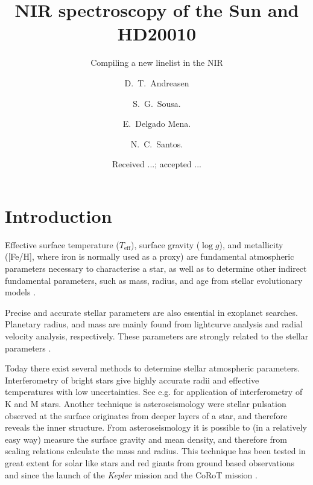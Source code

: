 \documentclass{aa}
\begin{document}
\title{NIR spectroscopy of the Sun and HD20010}
\subtitle{Compiling a new linelist in the NIR}


\author{D.~T.~Andreasen
    \and S.~G.~Sousa.
    \and E.~Delgado Mena.
    \and N.~C.~Santos.}









\date{Received ...; accepted ...}

\abstract{}{}{}{}



\maketitle



\section{Introduction}
\label{sec:introduction}

Effective surface temperature ($T_\mathrm{eff}$), surface gravity
($\log g$), and metallicity ([Fe/H], where iron is normally used
as a proxy) are fundamental atmospheric parameters necessary to
characterise a star, as well as to determine other indirect fundamental
parameters, such as mass, radius, and age from stellar evolutionary
models \citep{Girardi2000}.

Precise and accurate stellar parameters are also essential in
exoplanet searches. Planetary radius, and mass are mainly found from
lightcurve analysis and radial velocity analysis, respectively.
These parameters are strongly related to the stellar parameters
\citep{Ammler2009,Torres2008,Torres2012}.

Today there exist several methods to determine stellar atmospheric
parameters. Interferometry of bright stars give highly accurate
radii and effective temperatures with low uncertainties. See e.g.
\cite{Boyajian2012} for application of interferometry of K and M stars.
Another technique is asteroseismology were stellar pulsation observed
at the surface originates from deeper layers of a star, and therefore
reveals the inner structure. From asteroseismology it is possible to (in
a relatively easy way) measure the surface gravity and mean density,
and therefore from scaling relations \citep{Kjeldsen1995} calculate
the mass and radius. This technique has been tested in great extent
for solar like stars and red giants from ground based observations and
since the launch of the \emph{Kepler} mission and the CoRoT mission
\citep{Michel2008,Huber2011,Huber2012}.
\end{document}
